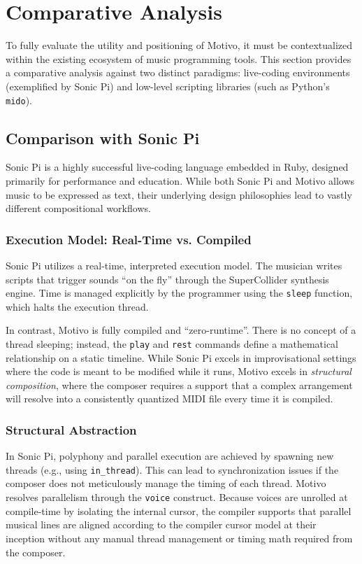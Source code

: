 
\section{Comparative Analysis}\label{detail-sec:evaluation-comparative}

To fully evaluate the utility and positioning of Motivo, it must be contextualized within the existing
ecosystem of music programming tools.
This section provides a comparative analysis against two distinct paradigms: live-coding environments (exemplified by
Sonic Pi) and low-level scripting libraries (such as Python's \texttt{mido}).

\subsection{Comparison with Sonic Pi}\label{detail-subsec:comparison-with-sonic-pi}

Sonic Pi is a highly successful live-coding language embedded in Ruby, designed primarily for performance and education.
While both Sonic Pi and Motivo allows music to be expressed as text, their underlying design philosophies lead
to vastly different compositional workflows.

\subsubsection{Execution Model: Real-Time vs. Compiled}
Sonic Pi utilizes a real-time, interpreted execution model.
The musician writes scripts that trigger sounds ``on the fly'' through the SuperCollider synthesis engine.
Time is managed explicitly by the programmer using the \texttt{sleep} function, which halts the execution thread.

In contrast, Motivo is fully compiled and ``zero-runtime''.
There is no concept of a thread sleeping; instead, the \texttt{play} and \texttt{rest} commands define a mathematical
relationship on a static timeline.
While Sonic Pi excels in improvisational settings where the code is meant to be modified while it runs, Motivo excels
in \textit{structural composition}, where the composer requires a support that a complex arrangement will resolve into
a consistently quantized MIDI file every time it is compiled.

\subsubsection{Structural Abstraction}
In Sonic Pi, polyphony and parallel execution are achieved by spawning new threads (e.g., using \texttt{in\_thread}).
This can lead to synchronization issues if the composer does not meticulously manage the timing of each thread.
Motivo resolves parallelism through the \texttt{voice} construct.
Because voices are unrolled at compile-time by isolating the internal cursor, the compiler supports that parallel
musical lines are aligned according to the compiler cursor model at their inception without any manual thread
management or timing math required
from the composer.

